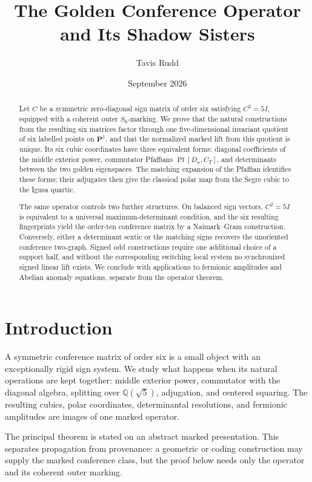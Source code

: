 \documentclass[11pt]{article}
\title{The Golden Conference Operator and Its Shadow Sisters}
\author{Tavis Rudd}
\date{September 2026}
\theoremstyle{definition}
\theoremstyle{remark}
\newcommand{\Pf}{\operatorname{Pf}}
\begin{document}
\maketitle

\begin{abstract}
Let \(C\) be a symmetric zero-diagonal sign matrix of order six satisfying
\(C^2=5I\), equipped with a coherent outer \(S_6\)-marking.  We prove that
the natural constructions from the resulting six matrices factor through
one five-dimensional invariant quotient of six labelled points on
\(\mathbf P^1\), and that the normalized marked lift from this quotient is
unique.  Its six cubic coordinates have three equivalent forms: diagonal
coefficients of the middle exterior power, commutator Pfaffians
\(\Pf[D_x,C_T]\), and determinants between the two golden eigenspaces.
The matching expansion of the Pfaffian identifies these forms; their
adjugates then give the classical polar map from the Segre cubic to the
Igusa quartic.

The same operator controls two further structures.  On balanced sign
vectors, \(C^2=5I\) is equivalent to a universal maximum-determinant
condition, and the six resulting fingerprints yield the order-ten
conference matrix by a Naimark--Gram construction.  Conversely, either a
determinant sextic or the matching signs recovers the unoriented conference
two-graph.  Signed odd constructions require one additional choice of a
support half, and without the corresponding switching local system no
synchronized signed linear lift exists.  We conclude with applications to
fermionic amplitudes and Abelian anomaly equations, separate from the
operator theorem.
\end{abstract}

\section{Introduction}

A symmetric conference matrix of order six is a small object with an
exceptionally rigid sign system.  We study what happens when its natural
operations are kept together: middle exterior power, commutator with the
diagonal algebra, splitting over \(\mathbb Q(\sqrt5)\), adjugation, and
centered squaring.  The resulting cubics, polar coordinates, determinantal
resolutions, and fermionic amplitudes are images of one marked operator.

The principal theorem is stated on an abstract marked presentation.  This
separates propagation from provenance: a geometric or coding construction
may supply the marked conference class, but the proof below needs only the
operator and its coherent outer marking.
\end{document}
